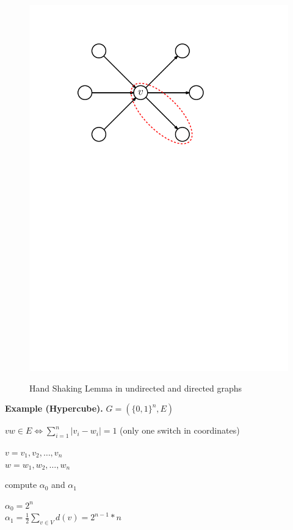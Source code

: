 \begin{figure}[htb]
{	\includegraphics[scale=.5]{01_graph_theory/pics/directed-graph_degree_handshaking-lemma.pdf}
}
\caption{Hand Shaking Lemma in undirected and directed graphs}
\label{fig:hand_shaking_lemma}
\end{figure}
\FloatBarrier

\textbf{Example (Hypercube).}
$G = (\{0,1\}^n, E)$

$vw \in E \Leftrightarrow \sum_{i=1}^{n} |v_i - w_i | = 1$ (only one switch in coordinates)

$v = v_1, v_2, \ldots , v_n$\\
$w = w_1, w_2, \ldots , w_n$

compute $\alpha_0$ and $\alpha_1$

$\alpha_0 = 2^n$ \\
$\alpha_1 = \frac{1}{2} \sum_{v \in V} d(v) = 2^{n-1} * n$

